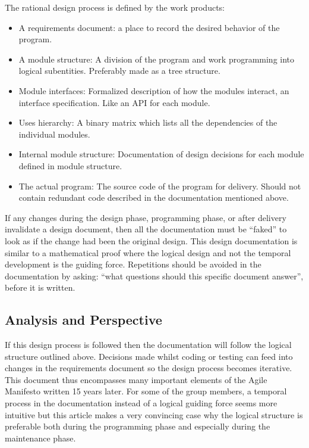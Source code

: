 \documentclass[11pt,a4paper]{report}
\begin{document}
The rational design process is defined by the work products:
\begin{itemize}
\item A requirements document: a place to record the desired behavior of the program.
\item A module structure: A division of the program and work programming into logical subentities. Preferably made as a tree structure.
\item Module interfaces: Formalized description of how the modules interact, an interface specification. Like an API for each module.
\item Uses hierarchy: A binary matrix which lists all the dependencies of the individual modules.
\item Internal module structure: Documentation of design decisions for each module defined in module structure.
\item The actual program: The source code of the program for delivery. Should not contain redundant code described in the documentation mentioned above.
\end{itemize}
If any changes during the design phase, programming phase, or after delivery invalidate a design document, then all the documentation must be ``faked'' to look as if the change had been the original design. This design documentation is similar to a mathematical proof where the logical design and not the temporal development is the guiding force. Repetitions should be avoided in the documentation by asking: ``what questions should this specific document answer'', before it is written.
\subsection{Analysis and Perspective}
If this design process is followed then the documentation will follow the logical structure outlined above. Decisions made whilst coding or testing can feed into changes in the requirements document so the design process becomes iterative. This document thus encompasses many important elements of the Agile Manifesto\cite{beck} written 15 years later. For some of the group members, a temporal process in the documentation instead of a logical guiding force seems more intuitive but this article makes a very convincing case why the logical structure is preferable both during the programming phase and especially during the maintenance phase.
\end{document}
